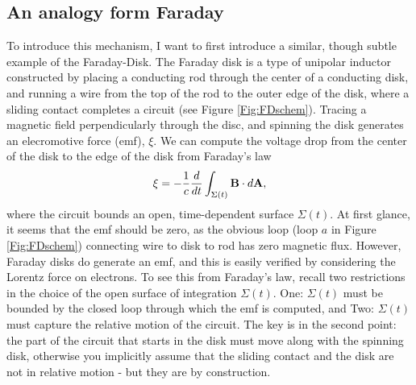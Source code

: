 \subsection{An analogy form Faraday}
To introduce this mechanism, I want to first introduce a similar, though
subtle example of the Faraday-Disk. The Faraday disk is a type of unipolar
inductor constructed by placing a conducting rod through the center of a
conducting disk, and running a wire from the top of the rod to the outer edge
of the disk, where a sliding contact completes a circuit (see Figure
\ref{Fig:FDschem}). Tracing a magnetic field perpendicularly through the disc,
and spinning the disk generates an elecromotive force (emf), $\xi$. We can compute
the voltage drop from the center of the disk to the edge of the disk from
Faraday's law
\begin{align} 
\xi = - \frac{1}{c}\frac{d}{dt}\int_{\Sigma(t)}{{\bf B} \cdot d{\bf A}}, 
\end{align} 
where the circuit bounds an open, time-dependent surface $\Sigma(t)$. At first
glance, it seems that the emf should be zero, as the obvious loop (loop $a$ in
Figure \ref{Fig:FDschem}) connecting wire to disk to rod has zero magnetic
flux. However, Faraday disks do generate an emf, and this is easily verified
by considering the Lorentz force on electrons. To see this from Faraday's law, recall two restrictions in the
choice of the open surface of integration $\Sigma(t)$. One: $\Sigma(t)$ must be bounded by the closed loop through which the emf is computed, and Two: $\Sigma(t)$ must capture the relative motion of the circuit.
The key is in the second point: the part of the circuit that starts in the
disk must move along with the spinning disk, otherwise you implicitly assume
that the sliding contact and the disk are not in relative motion - but they
are by construction.


